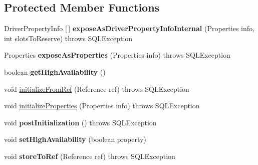 \subsection*{Protected Member Functions}
\begin{DoxyCompactItemize}
\item 
\mbox{\label{classcom_1_1mysql_1_1jdbc_1_1_connection_properties_impl_a8c179218d4c68a1e8ce104c75a5cc357}} 
Driver\+Property\+Info \mbox{[}$\,$\mbox{]} {\bfseries expose\+As\+Driver\+Property\+Info\+Internal} (Properties info, int slots\+To\+Reserve)  throws S\+Q\+L\+Exception 
\item 
\mbox{\label{classcom_1_1mysql_1_1jdbc_1_1_connection_properties_impl_aaf6eec1136f9f1ce313028c8b2572a39}} 
Properties {\bfseries expose\+As\+Properties} (Properties info)  throws S\+Q\+L\+Exception 
\item 
\mbox{\label{classcom_1_1mysql_1_1jdbc_1_1_connection_properties_impl_ae6c69a8386b1df62b6240db282837a6a}} 
boolean {\bfseries get\+High\+Availability} ()
\item 
void \mbox{\hyperlink{classcom_1_1mysql_1_1jdbc_1_1_connection_properties_impl_a38ef6db7230fb0560a58f329b1c92f07}{initialize\+From\+Ref}} (Reference ref)  throws S\+Q\+L\+Exception 
\item 
void \mbox{\hyperlink{classcom_1_1mysql_1_1jdbc_1_1_connection_properties_impl_a5ba8ddef0c7c382545a2e14ba52596e9}{initialize\+Properties}} (Properties info)  throws S\+Q\+L\+Exception 
\item 
\mbox{\label{classcom_1_1mysql_1_1jdbc_1_1_connection_properties_impl_abe3b92f6ddd2469e334e250e53871ec5}} 
void {\bfseries post\+Initialization} ()  throws S\+Q\+L\+Exception 
\item 
\mbox{\label{classcom_1_1mysql_1_1jdbc_1_1_connection_properties_impl_a5ca70e36e20685e133839806d34880e6}} 
void {\bfseries set\+High\+Availability} (boolean property)
\item 
\mbox{\label{classcom_1_1mysql_1_1jdbc_1_1_connection_properties_impl_a3d406fa3d5c7ef76386c72039c5c70bd}} 
void {\bfseries store\+To\+Ref} (Reference ref)  throws S\+Q\+L\+Exception 
\end{DoxyCompactItemize}

